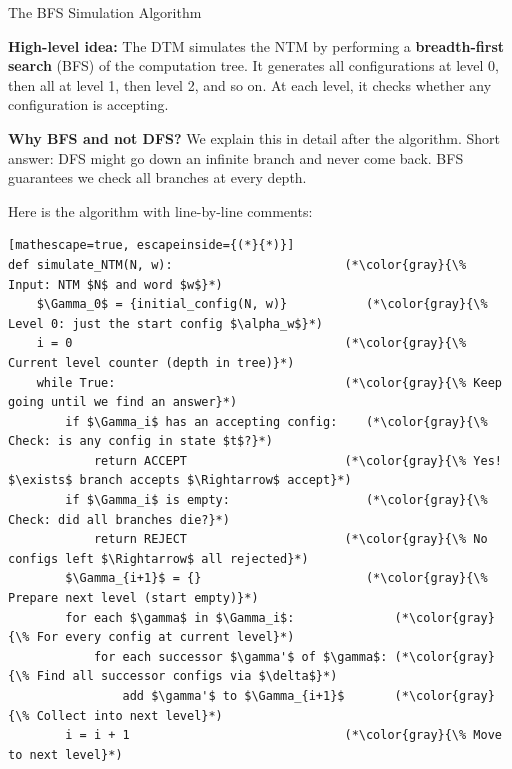 \begin{definitionbox}{{The BFS Simulation Algorithm}}

\textbf{High-level idea:} The DTM simulates the NTM by performing a
\textbf{breadth-first search} (BFS) of the computation tree. It generates all
configurations at level 0, then all at level 1, then level 2, and so on. At
each level, it checks whether any configuration is accepting.

\textbf{Why BFS and not DFS?} We explain this in detail after the algorithm.
Short answer: DFS might go down an infinite branch and never come back. BFS
guarantees we check all branches at every depth.

Here is the algorithm with line-by-line comments:

\begin{lstlisting}[mathescape=true, escapeinside={(*}{*)}]
def simulate_NTM(N, w):                        (*\color{gray}{\% Input: NTM $N$ and word $w$}*)
    $\Gamma_0$ = {initial_config(N, w)}           (*\color{gray}{\% Level 0: just the start config $\alpha_w$}*)
    i = 0                                      (*\color{gray}{\% Current level counter (depth in tree)}*)
    while True:                                (*\color{gray}{\% Keep going until we find an answer}*)
        if $\Gamma_i$ has an accepting config:    (*\color{gray}{\% Check: is any config in state $t$?}*)
            return ACCEPT                      (*\color{gray}{\% Yes! $\exists$ branch accepts $\Rightarrow$ accept}*)
        if $\Gamma_i$ is empty:                   (*\color{gray}{\% Check: did all branches die?}*)
            return REJECT                      (*\color{gray}{\% No configs left $\Rightarrow$ all rejected}*)
        $\Gamma_{i+1}$ = {}                       (*\color{gray}{\% Prepare next level (start empty)}*)
        for each $\gamma$ in $\Gamma_i$:              (*\color{gray}{\% For every config at current level}*)
            for each successor $\gamma'$ of $\gamma$: (*\color{gray}{\% Find all successor configs via $\delta$}*)
                add $\gamma'$ to $\Gamma_{i+1}$       (*\color{gray}{\% Collect into next level}*)
        i = i + 1                              (*\color{gray}{\% Move to next level}*)
\end{lstlisting}


\end{definitionbox}
